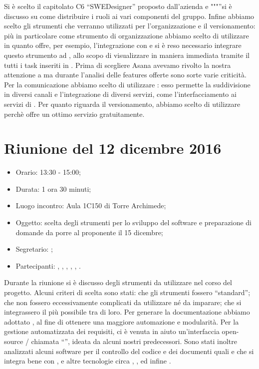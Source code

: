 Si è scelto il capitolato C6 “SWEDesigner” proposto dall'azienda \ZU e """”si è discusso su come distribuire i ruoli ai vari componenti del gruppo.
Infine abbiamo scelto gli strumenti che verranno utilizzati per l'organizzazione e il versionamento: più in particolare come strumento di organizzazione abbiamo scelto di utilizzare  in quanto offre, per esempio, l'integrazione con  e si è reso necessario integrare questo strumento ad , allo scopo di visualizzare in maniera immediata tramite il  tutti i task inseriti in . Prima di scegliere Asana avevamo rivolto la nostra attenzione a  ma durante l'analisi delle features offerte sono sorte varie criticità. Per la comunicazione abbiamo scelto di utilizzare : esso permette la suddivisione in diversi canali e l'integrazione di diversi servizi, come l'interfacciamento ai servizi di . Per quanto riguarda il versionamento, abbiamo scelto di utilizzare   perchè offre un ottimo servizio gratuitamente.



\section{Riunione del 12 dicembre 2016}

\begin{itemize}
	\item Orario: 13:30 - 15:00;
	\item Durata: 1 ora 30 minuti;
	\item Luogo incontro: Aula 1C150 di Torre Archimede; 
	\item Oggetto: scelta degli strumenti per lo sviluppo del software e preparazione di domande da porre al proponente il 15 dicembre;
	\item Segretario: \PB; 
	\item Partecipanti: \AZ, \GG, \LB, \LS, \MM, \PB.
\end{itemize}

Durante la riunione si è discusso degli strumenti da utilizzare nel corso del progetto. Alcuni criteri di scelta sono stati: che gli strumenti fossero “standard”; che non fossero eccessivamente complicati da utilizzare né da imparare; che si integrassero il più possibile tra di loro. Per generare la documentazione abbiamo adottato , al fine di ottenere una maggiore automazione e modularità. Per la gestione automatizzata dei requisiti, ci è venuta in aiuto un'interfaccia open-source / chiamata “”, ideata da alcuni nostri predecessori. Sono stati inoltre analizzati alcuni software per il controllo del codice e dei documenti quali  e  che si integra bene con , e altre tecnologie circa , ,  ed infine .

